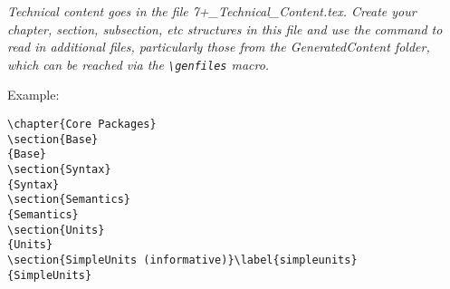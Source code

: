 \color{red}
{ \itshape Technical content goes in the file 7+\_Technical\_Content.tex.  Create your chapter, section, subsection, etc structures in this file and use the \lstinline!! command to read in additional files, particularly those from the GeneratedContent folder, which can be reached via the \lstinline!\genfiles! macro.  

Example:
\begin{lstlisting}
\chapter{Core Packages}
\section{Base}
{Base}
\section{Syntax}
{Syntax}
\section{Semantics}
{Semantics}
\section{Units}
{Units}
\section{SimpleUnits (informative)}\label{simpleunits}
{SimpleUnits}
\end{lstlisting}
}
\color{black}
